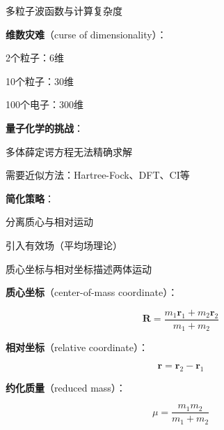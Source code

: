 \begin{frame}{多粒子波函数与计算复杂度}
  
    \begin{iqbitemize}
    \item \textbf{维数灾难}（curse of dimensionality）：
    \begin{iqbitemize}
      \item 2个粒子：6维
      \item 10个粒子：30维
      \item 100个电子：300维
    \end{iqbitemize}
    \item \textbf{量子化学的挑战}：
    \begin{iqbitemize}
      \item 多体薛定谔方程无法精确求解
      \item 需要近似方法：Hartree-Fock、DFT、CI等
    \end{iqbitemize}
    \item \textbf{简化策略}：
    \begin{iqbitemize}
      \item 分离质心与相对运动
      \item 引入有效场（平均场理论）
    \end{iqbitemize}
    \end{iqbitemize}
    \iqbtinysep

  

\end{frame}

\begin{frame}{质心坐标与相对坐标描述两体运动}

  
    \begin{iqbitemize}
    \item \textbf{质心坐标}（center-of-mass coordinate）：
    \end{iqbitemize}
    \[
      \mathbf{R} = \dfrac{m_1\mathbf{r}_1 + m_2\mathbf{r}_2}{m_1 + m_2}
    \]
    \begin{iqbitemize}
    \item \textbf{相对坐标}（relative coordinate）：
    \end{iqbitemize}
    \[
      \mathbf{r} = \mathbf{r}_2 - \mathbf{r}_1
    \]
    \begin{iqbitemize}
    \item \textbf{约化质量}（reduced mass）：
    \end{iqbitemize}
    \[
      \mu = \dfrac{m_1m_2}{m_1 + m_2}
    \]

    \iqbsmallsep

    \end{frame}

